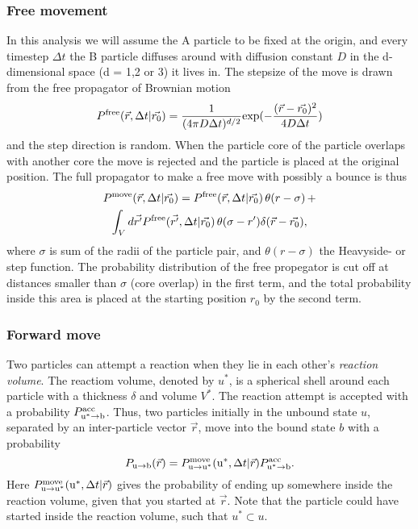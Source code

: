 \subsubsection{Free movement}
In this analysis we will assume the A particle to be fixed at the origin, and every timestep $\Delta t$ the B particle diffuses around with diffusion constant $D$ in the d-dimensional space (d = 1,2 or 3) it lives in. The stepsize of the move is drawn from the free propagator of Brownian motion 
\begin{equation}
P^{\rm free}(\vec{r},\Delta t|\vec{r_0}) = \frac{1}{(4 \pi D \Delta t)^{d/2}}{\rm exp}(-\frac{(\vec{r}-\vec{r_0})^2}{4 D \Delta t}) 
\end{equation}
and the step direction is random. When the particle core of the particle overlaps with another core the move is rejected and the particle is placed at the original position. The full propagator to make a free move with possibly a bounce is thus
\begin{multline}
 P^{\rm move}(\vec{r},\Delta t|\vec{r_0}) = P^{\rm free}(\vec{r},\Delta t|\vec{r_0}) \, \theta(r - \sigma) \, + \\ \int_{V} d\vec{r'}P^{\rm free}(\vec{r'},\Delta t|\vec{r_0}) \, \theta(\sigma - r')\delta(\vec{r}-\vec{r_0}),
\elabel{move_prop}
\end{multline}
where $\sigma$ is sum of the radii of the particle pair, and $\theta(r - \sigma)$ the Heavyside- or step function. The probability distribution of the free propegator is cut off at distances smaller than $\sigma$ (core overlap) in the first term, and the total probability inside this area is placed at the starting position $r_0$ by the second term.

\subsubsection{Forward move}
Two particles can attempt a reaction when they lie in each other's {\it reaction volume}. The reactiom volume, denoted by $u^*$, is a spherical shell around each particle with a thickness $\delta$ and volume $V^*$. The reaction attempt is accepted with a probability $P^{\rm acc}_{{\rm u}^* \to {\rm b}}$. Thus, two particles initially in the unbound state $u$, separated by an inter-particle vector $\vec{r}$, move into the bound state $b$ with a probability
\begin{equation}
P_{ \rm{u} \to \rm{b} }(\vec{r}) = P^{\rm move}_{{\rm u} \to {\rm u}^*}({\rm u}^*,\Delta t|\vec{r}) P^{\rm acc}_{{\rm u}^* \to {\rm b}}.
\end{equation}
Here $P^{\rm move}_{{\rm u} \to {\rm u}^*}({\rm u}^*,\Delta t|\vec{r})$ gives the probability of ending up somewhere inside the reaction volume, given that you started at $\vec{r}$. Note that the particle could have started inside the reaction volume, such that $u^* \subset u$.

